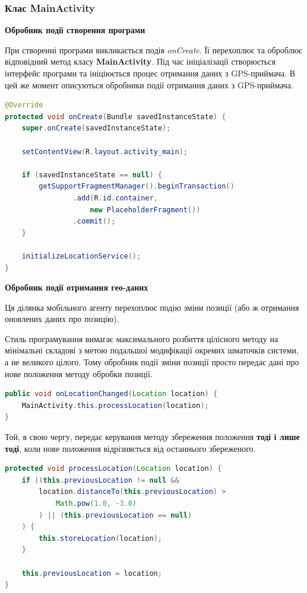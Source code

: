 \documentclass[simple,a4paper,14pt,ukrainian,utf8]{eskdtext}
\begin{document}
        \subsubsection{Клас MainActivity}
        
        	\textbf{Обробник події створення програми}
        	
        	При створенні програми викликається подія \textit{onCreate}. Її перехоплює та оброблює відповідний метод класу \textbf{MainActivity}. Під час ініціалізації створюється інтерфейс програми та ініціюється процес отримання даних з GPS-приймача. В цей же момент описуються обробники події отримання даних з GPS-приймача.
        	
        	\begin{lstlisting}[language=Java]
@Override
protected void onCreate(Bundle savedInstanceState) {
    super.onCreate(savedInstanceState);

    setContentView(R.layout.activity_main);

    if (savedInstanceState == null) {
        getSupportFragmentManager().beginTransaction()
                .add(R.id.container, 
                	new PlaceholderFragment())
                .commit();
    }

    initializeLocationService();
}
        	\end{lstlisting}
        	
        	\textbf{Обробник події отримання гео-даних}
        	
        	Ця ділянка мобільного агенту перехоплює подію зміни позиції (або ж отримання оновлених даних про позицію).
        	
        	Стиль програмування вимагає максимального розбиття цілісного методу на мінімальні складові з метою подальшої модифікації окремих шматочків системи, а не великого цілого. Тому обробник події зміни позиції просто передає дані про нове положення методу обробки позиції.
        	
\begin{lstlisting}[language=Java]
public void onLocationChanged(Location location) {
	MainActivity.this.processLocation(location);
}
\end{lstlisting}

			Той, в свою чергу, передає керування методу збереження положення \textbf{тоді і лише тоді}, коли нове положення відрізняється від останнього збереженого.
			
\begin{lstlisting}[language=Java]
protected void processLocation(Location location) {
    if ((this.previousLocation != null && 
    	location.distanceTo(this.previousLocation) > 
    		Math.pow(1.0, -3.0)
    	) || (this.previousLocation == null)
   	) {
        this.storeLocation(location);
    }

    this.previousLocation = location;
}
\end{lstlisting}
\end{document}
